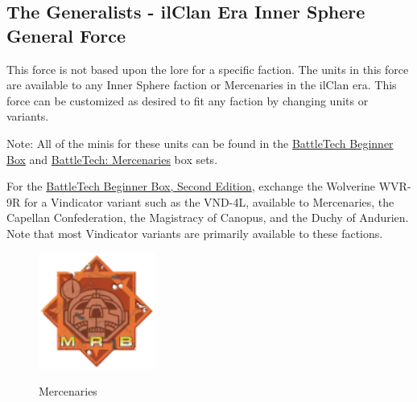 \subsection{The Generalists - ilClan Era Inner Sphere General Force}

This force is not based upon the lore for a specific faction.
The units in this force are available to any Inner Sphere faction or Mercenaries in the ilClan era.
This force can be customized as desired to fit any faction by changing units or variants.

Note: All of the minis for these units can be found in the \href{https://www.sarna.net/wiki/BattleTech_Beginner_Box}{BattleTech Beginner Box} and \href{https://www.sarna.net/wiki/BattleTech:_Mercenaries}{BattleTech: Mercenaries} box sets.

For the \href{https://www.sarna.net/wiki/BattleTech_Beginner_Box,_Second_Edition}{BattleTech Beginner Box, Second Edition}, exchange the Wolverine WVR-9R for a Vindicator variant such as the VND-4L, available to Mercenaries, the Capellan Confederation, the Magistracy of Canopus, and the Duchy of Andurien.
Note that most Vindicator variants are primarily available to these factions.

\begin{figure}[!h]
  \centering
  \includegraphics[alt='Mercenary Logo', width=1.5in, height=1.5in]{img/Mercenary.png}
  \caption*{Mercenaries}
\end{figure}

